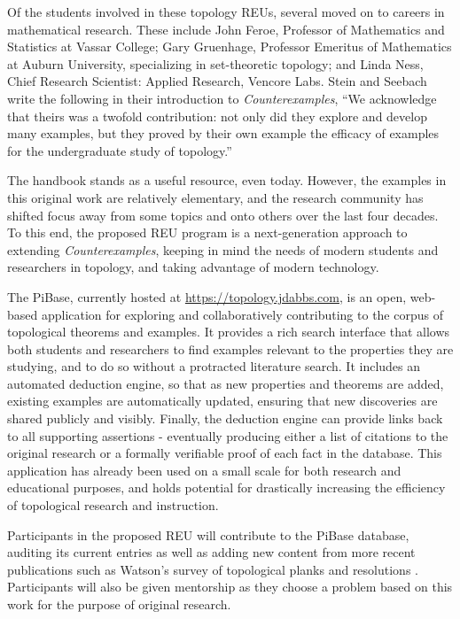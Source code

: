   Of the students involved in these topology REUs, several moved on to careers
  in mathematical research. These include John Feroe,
  Professor of Mathematics and Statistics at Vassar College;
  Gary Gruenhage, Professor Emeritus of Mathematics at Auburn University,
  specializing in set-theoretic topology; and Linda Ness,
  Chief	Research Scientist:	Applied	Research,	Vencore	Labs. Stein and
  Seebach write the following in their introduction to \textit{Counterexamples},
  ``We acknowledge that theirs was a twofold contribution: not only did
  they explore and develop many examples, but they proved by their own
  example the efficacy of examples for the undergraduate study of topology.''

  The handbook stands as a useful resource, even today.
  However, the examples in this original work are relatively elementary,
  and the research community has shifted focus
  away from some topics and onto others over the last four decades.
  To this end,
  the proposed REU program is a next-generation approach to extending
  \textit{Counterexamples}, keeping in mind the needs of
  modern students and researchers in topology, and taking advantage of modern
  technology.

  The PiBase, currently hosted at \url{https://topology.jdabbs.com},
  is an open, web-based application for exploring and collaboratively
  contributing to the corpus of topological theorems and examples. It provides
  a rich search interface that allows both students and researchers to find
  examples relevant to the properties they are studying, and to do so without
  a protracted literature search. It includes an automated deduction engine,
  so that as new properties and theorems are added, existing examples are
  automatically updated, ensuring that new discoveries are shared publicly
  and visibly. Finally, the deduction engine can provide links back to all
  supporting assertions - eventually producing either a list of citations
  to the original research or a formally verifiable proof of each fact in
  the database. This application has already been used on a small scale for both
  research and educational purposes, and holds potential for drastically
  increasing the efficiency of topological research and instruction.

  Participants in the proposed REU will contribute to the PiBase database,
  auditing its current entries as well as adding new content from more recent
  publications such as Watson's survey of topological planks and
  resolutions \cite{MR1229141}. Participants will also be given mentorship
  as they choose a problem based on this work for the purpose of original
  research.

